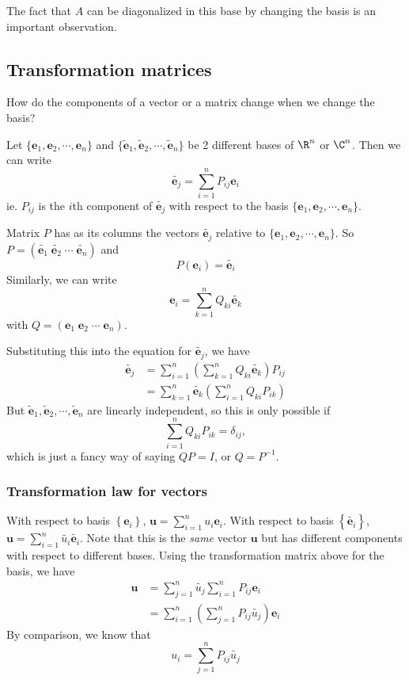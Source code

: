 \documentclass[a4paper]{article}
\begin{document}
      The fact that $A$ can be diagonalized in this base by changing the basis is an important observation.

      \subsection{Transformation matrices}
      How do the components of a vector or a matrix change when we change the basis?

      Let $\{\mathbf{e}_1, \mathbf{e}_2, \cdots, \mathbf{e}_n\}$ and $\{\tilde{\mathbf{e}}_1, \tilde{\mathbf{e}}_2,\cdots,  \tilde{\mathbf{e}}_n\}$ be 2 different bases of $\R^n$ or $\C^n$. Then we can write
      \[
        \tilde{\mathbf{e}_j} = \sum_{i = 1}^n P_{ij}\mathbf{e}_i
      \]
      ie. $P_{ij}$ is the $i$th component of $\tilde{\mathbf{e}_j}$ with respect to the basis $\{\mathbf{e}_1, \mathbf{e}_2, \cdots, \mathbf{e}_n\}$.

      Matrix $P$ has as its columns the vectors $\tilde{\mathbf{e}_j}$ relative to $\{\mathbf{e}_1, \mathbf{e}_2, \cdots, \mathbf{e}_n\}$. So $P = (\tilde{\mathbf{e}_1}\; \tilde{\mathbf{e}_2}\; \cdots \; \tilde{\mathbf{e}_n})$ and 
      \[
        P(\mathbf{e}_i) = \tilde{\mathbf{e}_i}
      \]
      Similarly, we can write 
      \[
        \mathbf{e}_i = \sum_{k = 1}^nQ_{ki} \tilde{\mathbf{e}_k}
      \]
      with $Q = (\mathbf{e}_1\; \mathbf{e}_2\;\cdots\;\mathbf{e}_n)$.

      Substituting this into the equation for $\tilde{\mathbf{e}_j}$, we have
      \begin{align*}
        \tilde{\mathbf{e}_j} &= \sum_{i = 1}^n\left(\sum_{k = 1}^{n} Q_{ki}\tilde{\mathbf{e}_k}\right)P_{ij}\\
        &= \sum_{k = 1}^n \tilde{\mathbf{e}_k} \left(\sum_{i = 1}^n Q_{ki}P_{ik}\right)
      \end{align*}
      But $\tilde{\mathbf{e}}_1, \tilde{\mathbf{e}}_2,\cdots,  \tilde{\mathbf{e}}_n$ are linearly independent, so this is only possible if 
      \[
        \sum_{i = 1}^n Q_{ki}P_{ik} = \delta_{ij},
      \]
      which is just a fancy way of saying $QP = I$, or $Q = P^{-1}$.

      \subsubsection{Transformation law for vectors}
      With respect to basis $\left\{\mathbf{e}_i\right\}$, $\mathbf{u} = \sum_{i = 1}^n u_i\mathbf{e}_i$. 
      With respect to basis $\left\{\tilde{\mathbf{e}_i}\right\}$, $\mathbf{u} = \sum_{i = 1}^n \tilde{u_i}\tilde{\mathbf{e}_i}$. Note that this is the \emph{same} vector $\mathbf{u}$ but has different components with respect to different bases. Using the transformation matrix above for the basis, we have
      \begin{align*}
        \mathbf{u} &= \sum_{j= 1}^n \tilde{u_j} \sum_{i = 1}^{n}P_{ij}\mathbf{e}_i\\
        &= \sum_{i = 1}^n \left(\sum_{j = 1}^n P_{ij}\tilde{u_j}\right) \mathbf{e}_i
      \end{align*}
      By comparison, we know that 
      \[
        u_i = \sum_{j = 1}^n P_{ij}\tilde{u_j}
      \]
\end{document}
